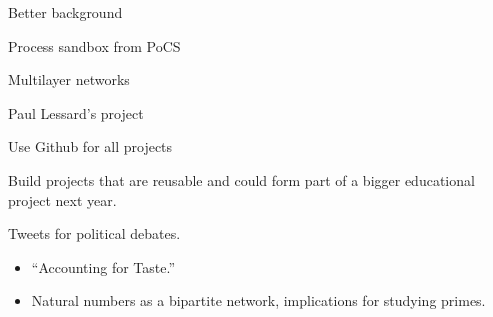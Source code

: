 

\begin{frame}
  Better background
\end{frame}

\begin{frame}
  Process sandbox from PoCS
\end{frame}

\begin{frame}
  Multilayer networks

\end{frame}

\begin{frame}
  Paul Lessard's project
\end{frame}

\begin{frame}
  Use Github for all projects

  Build projects that are reusable and
  could form part of a bigger educational project
  next year.

  
\end{frame}


\begin{frame}
  Tweets for political debates.
  
  
\end{frame}

\begin{frame}

  \begin{itemize}
  \item 
    ``Accounting for Taste.''
  \item 
    Natural numbers as a bipartite network, implications for studying primes.
  \end{itemize}
  
\end{frame}





